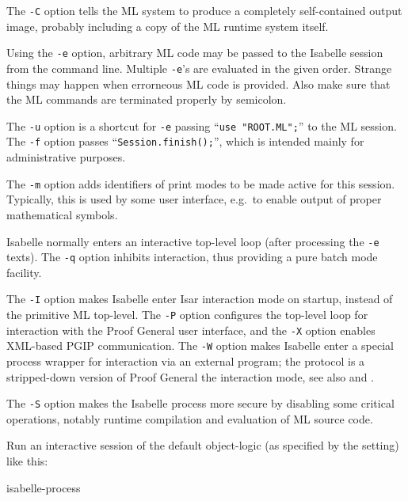 \begin{isabellebody}
\begin{isamarkuptext}
  \medskip The \verb|-C| option tells the ML system to produce
  a completely self-contained output image, probably including a copy
  of the ML runtime system itself.

  \medskip Using the \verb|-e| option, arbitrary ML code may be
  passed to the Isabelle session from the command line. Multiple
  \verb|-e|'s are evaluated in the given order. Strange things
  may happen when errorneous ML code is provided. Also make sure that
  the ML commands are terminated properly by semicolon.

  \medskip The \verb|-u| option is a shortcut for \verb|-e| passing ``\verb|use "ROOT.ML";|'' to the ML session.
  The \verb|-f| option passes ``\verb|Session.finish();|'', which is intended mainly for administrative
  purposes.

  \medskip The \verb|-m| option adds identifiers of print modes
  to be made active for this session. Typically, this is used by some
  user interface, e.g.\ to enable output of proper mathematical
  symbols.

  \medskip Isabelle normally enters an interactive top-level loop
  (after processing the \verb|-e| texts). The \verb|-q|
  option inhibits interaction, thus providing a pure batch mode
  facility.

  \medskip The \verb|-I| option makes Isabelle enter Isar
  interaction mode on startup, instead of the primitive ML top-level.
  The \verb|-P| option configures the top-level loop for
  interaction with the Proof General user interface, and the
  \verb|-X| option enables XML-based PGIP communication.  The
  \verb|-W| option makes Isabelle enter a special process
  wrapper for interaction via an external program; the protocol is a
  stripped-down version of Proof General the interaction mode, see
  also \hyperlink{file.~~/src/Pure/Tools/isabelle-process.ML}{\mbox{}} and \hyperlink{file.~~/src/Pure/Tools/isabelle-process.scala}{\mbox{}}.

  \medskip The \verb|-S| option makes the Isabelle process more
  secure by disabling some critical operations, notably runtime
  compilation and evaluation of ML source code.%
\end{isamarkuptext}%
\isamarkuptrue%
%
\isamarkuptrue%
%
\begin{isamarkuptext}%
Run an interactive session of the default object-logic (as specified
  by the \hyperlink{setting.ISABELLE-LOGIC}{\mbox{}} setting) like this:
\begin{ttbox}
isabelle-process
\end{ttbox}


\end{isamarkuptext}
\end{isabellebody}
